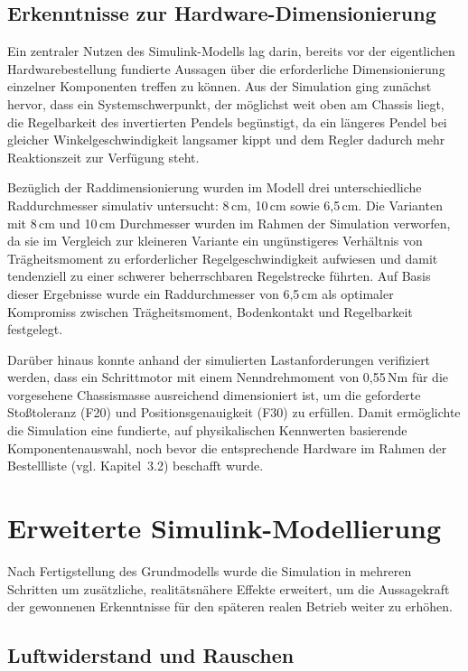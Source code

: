\documentclass[12pt,ngerman,numbers=noenddot,abstracton,headsepline]{scrreprt}
\begin{document}
\subsection{Erkenntnisse zur Hardware-Dimensionierung}
\label{subsec:simulink_dimensionierung}

Ein zentraler Nutzen des Simulink-Modells lag darin, bereits vor der eigentlichen Hardwarebestellung fundierte Aussagen über die erforderliche Dimensionierung einzelner Komponenten treffen zu können. Aus der Simulation ging zunächst hervor, dass ein Systemschwerpunkt, der möglichst weit oben am Chassis liegt, die Regelbarkeit des invertierten Pendels begünstigt, da ein längeres Pendel bei gleicher Winkelgeschwindigkeit langsamer kippt und dem Regler dadurch mehr Reaktionszeit zur Verfügung steht.

Bezüglich der Raddimensionierung wurden im Modell drei unterschiedliche Raddurchmesser simulativ untersucht: 8\,cm, 10\,cm sowie 6,5\,cm. Die Varianten mit 8\,cm und 10\,cm Durchmesser wurden im Rahmen der Simulation verworfen, da sie im Vergleich zur kleineren Variante ein ungünstigeres Verhältnis von Trägheitsmoment zu erforderlicher Regelgeschwindigkeit aufwiesen und damit tendenziell zu einer schwerer beherrschbaren Regelstrecke führten. Auf Basis dieser Ergebnisse wurde ein Raddurchmesser von 6,5\,cm als optimaler Kompromiss zwischen Trägheitsmoment, Bodenkontakt und Regelbarkeit festgelegt.

Darüber hinaus konnte anhand der simulierten Lastanforderungen verifiziert werden, dass ein Schrittmotor mit einem Nenndrehmoment von 0,55\,Nm für die vorgesehene Chassismasse ausreichend dimensioniert ist, um die geforderte Stoßtoleranz (F20) und Positionsgenauigkeit (F30) zu erfüllen. Damit ermöglichte die Simulation eine fundierte, auf physikalischen Kennwerten basierende Komponentenauswahl, noch bevor die entsprechende Hardware im Rahmen der Bestellliste (vgl. Kapitel~3.2) beschafft wurde.

\section{Erweiterte Simulink-Modellierung}
\label{sec:simulink_erweitert}

Nach Fertigstellung des Grundmodells wurde die Simulation in mehreren Schritten um zusätzliche, realitätsnähere Effekte erweitert, um die Aussagekraft der gewonnenen Erkenntnisse für den späteren realen Betrieb weiter zu erhöhen.

\subsection{Luftwiderstand und Rauschen}
\label{subsec:simulink_rauschen}
\end{document}
